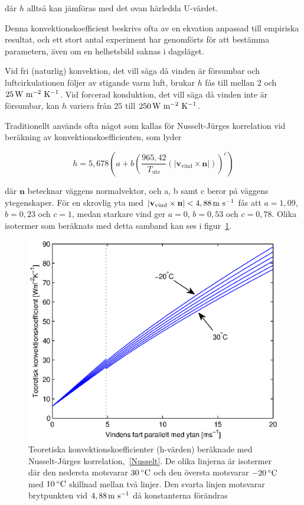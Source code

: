där $h$ alltså kan jämföras med det ovan härledda U-värdet. 

Denna konvektionskoefficient beskrivs ofta av en ekvation anpassad till empiriska resultat, och ett stort antal experiment har genomförts för att bestämma parametern, även om en helhetsbild saknas i dagsläget.

Vid fri (naturlig) konvektion, det vill säga då vinden är försumbar och luftcirkulationen
följer av stigande varm luft, brukar $h$ fås till mellan $2$ och $\unit[25]{W~m^{-2}~K^{-1}}$.
Vid forcerad konduktion, det vill säga då vinden inte är försumbar,
kan $h$ variera från $25$ till $\unit[250]{W~m^{-2}~K^{-1}}$. \cite{ASHRAE09}

Traditionellt används ofta något som kallas för Nusselt-Jürges korrelation vid beräkning av konvektionskoefficienten, som lyder

\begin{equation}\label{Nusselt}
h = 5,678 \left( a + b \left( \frac{965,42}{T_\text{ute}}\left(|\mathbf{v}_\text{vind}\times \mathbf{n}|\right) \right)^c \right)
\end{equation}

där $\mathbf{n}$ betecknar väggens normalvektor, och a, b samt c beror på väggens ytegenskaper. För en skrovlig yta med $|\mathbf{v}_\text{vind}\times \mathbf{n}| < \unit[4,88]{m~s^{-1}}$ fås att $a=1,09$, $b=0,23$ och $c=1$, medan starkare vind ger $a=0$, $b=0,53$ och $c=0,78$. Olika isotermer som beräknats med detta samband kan ses i figur~\ref{hvalues}.

\begin{figure}[hpbt]\centering
\includegraphics[scale=0.7]{images/hvalues.eps}
\caption{Teoretiska konvektionskoefficienter (h-värden) beräknade med Nusselt-Jürges korrelation,~\eqref{Nusselt}. De olika linjerna är isotermer där den nedersta motsvarar $\unit[30]{^{\circ}C}$ och den översta motsvarar $\unit[-20]{^{\circ}C}$ med $\unit[10]{^{\circ}C}$ skillnad mellan två linjer. Den svarta linjen motsvarar brytpunkten vid $\unit[4,88]{m~s^{-1}}$ då konstanterna förändras}
\label{hvalues}
\end{figure}

